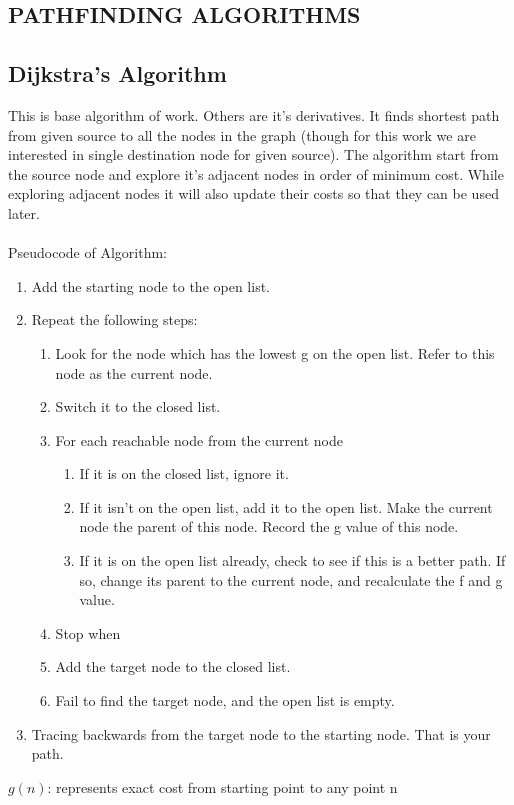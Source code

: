 \documentclass[a4paper, 12pt]{article}
\begin{document}
\hspace{1.5cm} 
\newpage
\begin{center}
\section{PATHFINDING ALGORITHMS}
\end{center}
\subsection{Dijkstra's Algorithm}
\par
\hspace{1cm}
This is base algorithm of work. Others are it's derivatives. It finds shortest path from given source to all the nodes in the graph (though for this work we are interested in single destination node for given source). The algorithm start from the source node and explore it's adjacent nodes in order of minimum cost. While exploring adjacent nodes it will also update their costs so that they can be used later.
\\
\\
Pseudocode of Algorithm:
\begin{enumerate}
  \item Add the starting node to the open list.
  \item Repeat the following steps:
	\begin{enumerate}
		\item Look for the node which has the lowest g on the open list. Refer to this node as the current node.
		\item Switch it to the closed list.
		\item For each reachable node from the current node
			\begin{enumerate}
			\item If it is on the closed list, ignore it.
			\item If it isn’t on the open list, add it to the open list. Make the current node the parent of this node. Record the g value of this node.
			\item If it is on the open list already, check to see if this is a better path. If so, change its parent to the current node, and recalculate the f and g value.
			\end{enumerate}
		\item Stop when
			\item Add the target node to the closed list.
			\item Fail to find the target node, and the open list is empty.
	\end{enumerate}
  \item Tracing backwards from the target node to the starting node. That is your path.
\end{enumerate}
$ g(n) $: represents exact cost from starting point to any point n \\
\newpage
\end{document}
